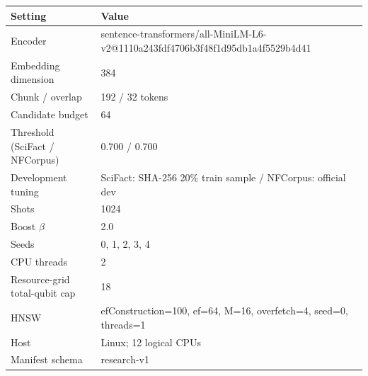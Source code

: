 \begin{tabular}{ll}
\toprule
Setting & Value\\
\midrule
Encoder & sentence-transformers/all-MiniLM-L6-v2@1110a243fdf4706b3f48f1d95db1a4f5529b4d41\\
Embedding dimension & 384\\
Chunk / overlap & 192 / 32 tokens\\
Candidate budget & 64\\
Threshold (SciFact / NFCorpus) & 0.700 / 0.700\\
Development tuning & SciFact: SHA-256 20\% train sample / NFCorpus: official dev\\
Shots & 1024\\
Boost $\beta$ & 2.0\\
Seeds & 0, 1, 2, 3, 4\\
CPU threads & 2\\
Resource-grid total-qubit cap & 18\\
HNSW & efConstruction=100, ef=64, M=16, overfetch=4, seed=0, threads=1\\
Host & Linux; 12 logical CPUs\\
Manifest schema & research-v1\\
\bottomrule
\end{tabular}
